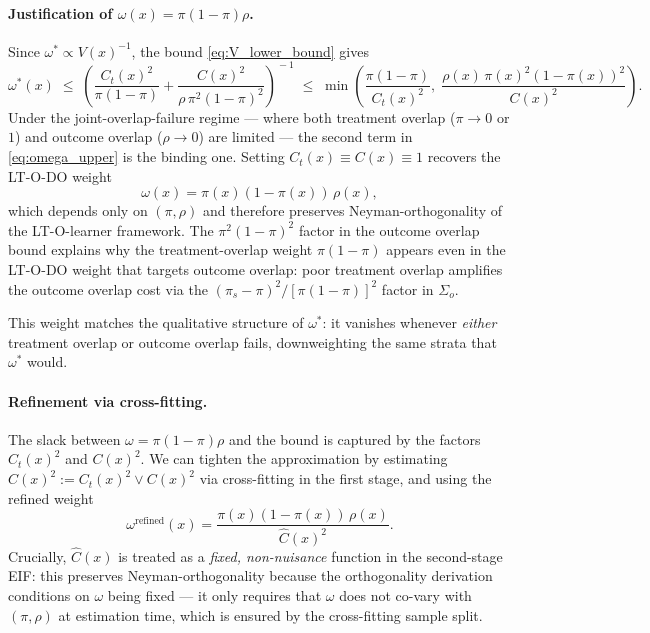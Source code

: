 \documentclass{article}
\theoremstyle{plain}
\theoremstyle{definition}
\theoremstyle{remark}
\newcommand{\1}{\mathds{1}}                %
\begin{document}
\paragraph{Justification of $\omega(x) = \pi(1-\pi)\rho$.}
Since $\omega^* \propto V(x)^{-1}$, the bound \eqref{eq:V_lower_bound} gives
\begin{equation}
\omega^*(x) \;\leq\; \left(\frac{C_t(x)^2}{\pi(1-\pi)} + \frac{C(x)^2}{\rho\,\pi^2(1-\pi)^2}\right)^{\!-1}
\;\leq\; \min\!\left(\frac{\pi(1-\pi)}{C_t(x)^2},\; \frac{\rho(x)\,\pi(x)^2(1-\pi(x))^2}{C(x)^2}\right).
\label{eq:omega_upper}
\end{equation}
Under the joint-overlap-failure regime --- where both treatment overlap ($\pi \to 0$ or
$1$) and outcome overlap ($\rho \to 0$) are limited --- the second term in
\eqref{eq:omega_upper} is the binding one. Setting $C_t(x) \equiv C(x) \equiv 1$ recovers
the LT-O-DO weight
\begin{equation}
\omega(x) = \pi(x)(1-\pi(x))\,\rho(x),
\end{equation}
which depends only on $(\pi, \rho)$ and therefore preserves Neyman-orthogonality of the
LT-O-learner framework. The $\pi^2(1-\pi)^2$ factor in the outcome overlap bound
explains why the treatment-overlap weight $\pi(1-\pi)$ appears even in the LT-O-DO
weight that targets outcome overlap: poor treatment overlap amplifies the outcome
overlap cost via the $(\pi_s - \pi)^2/[\pi(1-\pi)]^2$ factor in $\Sigma_o$.

This weight matches the qualitative structure of $\omega^*$: it vanishes whenever
\emph{either} treatment overlap or outcome overlap fails, downweighting the same strata
that $\omega^*$ would.

\paragraph{Refinement via cross-fitting.}
The slack between $\omega = \pi(1-\pi)\rho$ and the bound is captured by the factors
$C_t(x)^2$ and $C(x)^2$. We can tighten the approximation by estimating
$\hat{C}(x)^2 := C_t(x)^2 \vee C(x)^2$ via cross-fitting in the first stage, and using
the refined weight
\begin{equation}
\omega^{\text{refined}}(x) = \frac{\pi(x)(1-\pi(x))\,\rho(x)}{\hat{C}(x)^2}.
\end{equation}
Crucially, $\hat{C}(x)$ is treated as a \emph{fixed, non-nuisance} function in the
second-stage EIF: this preserves Neyman-orthogonality because the orthogonality
derivation conditions on $\omega$ being fixed --- it only requires that $\omega$ does not
co-vary with $(\pi, \rho)$ at estimation time, which is ensured by the cross-fitting
sample split.
\end{document}

